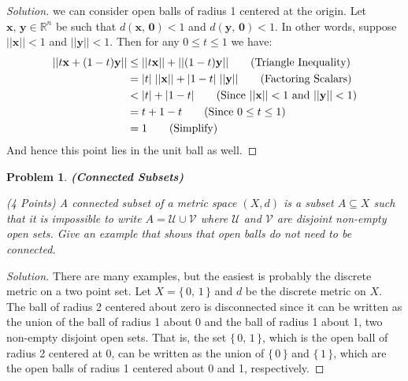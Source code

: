 \documentclass{article}
\theoremstyle{normal}
\newtheorem{problem}{Problem}
\begin{document}
\begin{proof}[Solution]
        we can consider open balls of radius 1 centered at the origin. Let
        $\mathbf{x},\,\mathbf{y}\in\mathbb{R}^{n}$ be such that
        $d(\mathbf{x},\,\mathbf{0})<1$ and $d(\mathbf{y},\,\mathbf{0})<1$.
        In other words, suppose $||\mathbf{x}||<1$ and $||\mathbf{y}||<1$.
        Then for any $0\leq{t}\leq{1}$ we have:
        \begin{align}
            ||t\mathbf{x}+(1-t)\mathbf{y}||
                &\leq||t\mathbf{x}||+||(1-t)\mathbf{y}||
                    \tag{Triangle Inequality}\\
                &=|t|\;||\mathbf{x}||+|1-t|\;||\mathbf{y}||
                    \tag{Factoring Scalars}\\
                &<|t|+|1-t|
                    \tag{Since $||\mathbf{x}||<1$ and $||\mathbf{y}||<1$}\\
                &=t+1-t\tag{Since $0\leq{t}\leq{1}$}\\
                &=1\tag{Simplify}
        \end{align}
        And hence this point lies in the unit ball as well.
    \end{proof}
    \newpage
    \color{blue}
    \begin{problem}
        \textbf{(Connected Subsets)}
        \par\hfill\par
        (4 Points)
        A connected subset of a metric space $(X,d)$ is a subset
        $A\subseteq{X}$ such that it is impossible to write
        $A=\mathcal{U}\cup\mathcal{V}$ where $\mathcal{U}$ and $\mathcal{V}$
        are disjoint non-empty open sets. Give an example that shows that
        open balls do not need to be connected.
    \end{problem}
    \color{black}
    \begin{proof}[Solution]
        There are many examples, but the easiest is probably the discrete
        metric on a two point set. Let $X=\{\,0,\,1\,\}$ and $d$ be the
        discrete metric on $X$. The ball of radius 2 centered about zero is
        disconnected since it can be written as the union of the ball of radius
        1 about 0 and the ball of radius 1 about 1, two non-empty disjoint
        open sets. That is, the set $\{\,0,\,1\,\}$, which is the open ball of
        radius 2 centered at 0, can be written as the union of
        $\{\,0\,\}$ and $\{\,1\,\}$, which are the open balls of radius 1
        centered about 0 and 1, respectively.
    \end{proof}
\end{document}
